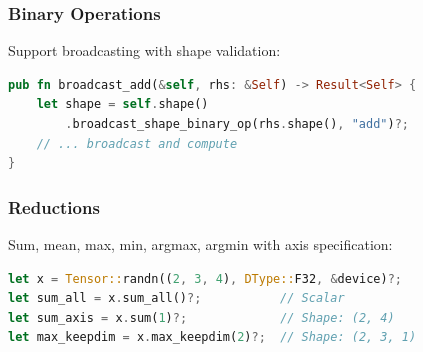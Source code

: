 \subsubsection{Binary Operations}

Support broadcasting with shape validation:

\begin{lstlisting}[language=Rust]
pub fn broadcast_add(&self, rhs: &Self) -> Result<Self> {
    let shape = self.shape()
        .broadcast_shape_binary_op(rhs.shape(), "add")?;
    // ... broadcast and compute
}
\end{lstlisting}

\subsubsection{Reductions}

Sum, mean, max, min, argmax, argmin with axis specification:

\begin{lstlisting}[language=Rust]
let x = Tensor::randn((2, 3, 4), DType::F32, &device)?;
let sum_all = x.sum_all()?;           // Scalar
let sum_axis = x.sum(1)?;             // Shape: (2, 4)
let max_keepdim = x.max_keepdim(2)?;  // Shape: (2, 3, 1)
\end{lstlisting}

